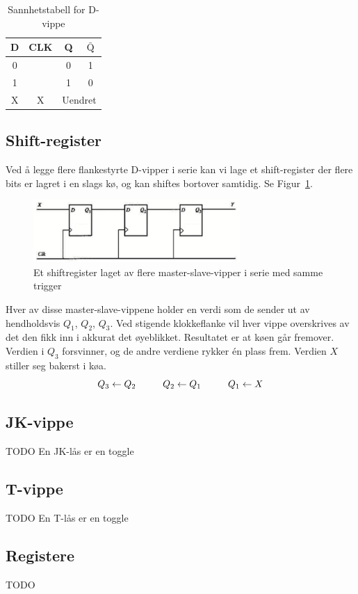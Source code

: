 \documentclass[12pt,a4paper,norsk]{article}
\newcommand{\rising}{\texttiming{[-,timing/slope=0]LH}}
\begin{document}
\begin{table}[hbt!]
  \centering
  \begin{tabular}{cc|cc}
    \toprule
    D & CLK & Q & $\bar{\text{Q}}$ \\
    \midrule
    0 & \rising{} & 0 & 1\\
    1 & \rising{} & 1 & 0\\
    X & X & \multicolumn{2}{c}{Uendret}\\
    \bottomrule
  \end{tabular}
  \caption{Sannhetstabell for D-vippe}
\end{table}

\subsection{Shift-register}
Ved å legge flere flankestyrte D-vipper i serie kan vi lage et shift-register der
flere bits er lagret i en slags kø, og kan shiftes bortover samtidig. Se Figur~\ref{fig:trigger_shift}.

\begin{figure}[hbt!]
  \centering
  \includegraphics[width=0.7\textwidth,height=\textheight,keepaspectratio]{Krets_TriggerShift}
  \caption{Et shiftregister laget av flere master-slave-vipper i serie med samme trigger\label{fig:trigger_shift}}
\end{figure}

Hver av disse master-slave-vippene holder en verdi som de sender ut av hendholdsvis $Q_{1}$,
$Q_{2}$, $Q_{3}$. Ved stigende klokkeflanke vil hver vippe overskrives av det
den fikk inn i akkurat det øyeblikket. Resultatet er at køen går fremover.
Verdien i $Q_{3}$ forsvinner, og de andre verdiene rykker én plass frem. Verdien
$X$ stiller seg bakerst i køa.
\[
  Q_{3} \leftarrow Q_{2} \hspace{10mm} Q_{2} \leftarrow Q_{1} \hspace{10mm}  Q_{1} \leftarrow X
\]

\subsection{JK-vippe}
TODO
En JK-lås er en toggle

\subsection{T-vippe}
TODO
En T-lås er en toggle


\subsection{Registere}
TODO
\end{document}

